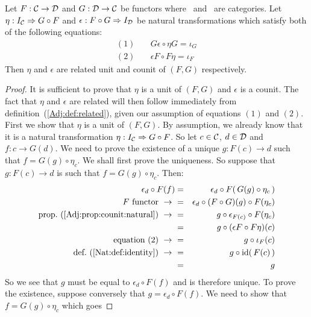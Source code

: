\begin{prop}\label{Adj:prop:related:just:natural}
    Let $F:\mbox{$\cal C$}\to\mbox{$\cal D$}$ and $G:\mbox{$\cal D$}\to\mbox{$\cal C$}$ be functors where \Cat\ and \Dat\ 
    are categories. Let $\eta:I_{\cal C}\Rightarrow G\circ F$ and 
    $\epsilon:F\circ G\Rightarrow I_{\cal D}$ be natural transformations
    which satisfy both of the following equations:
        \begin{eqnarray*}
            (1)&\ &G\epsilon\circ\eta G=\iota_{G}\\
            (2)&\ &\epsilon F \circ F\eta=\iota_{F}
        \end{eqnarray*}
    Then $\eta$ and $\epsilon$ are related unit and counit of $(F,G)$ respectively.
\end{prop}
\begin{proof}
    It is sufficient to prove that $\eta$ is a unit of $(F,G)$ and $\epsilon$ 
    is a counit. The fact that $\eta$ and $\epsilon$ are related will then 
    follow immediately from  definition~(\ref{Adj:def:related}), given our
    assumption of equations $(1)$ and $(2)$. First we show that $\eta$ is
    a unit of $(F,G)$. By assumption, we already know that it is a natural
    transformation $\eta:I_{\cal C}\Rightarrow G\circ F$. So let $c\in\mbox{$\cal C$}$,
    $d\in\mbox{$\cal D$}$ and $f:c\to G(d)$. We need to prove the existence of a unique
    $g:F(c)\to d$ such that $f=G(g)\circ\eta_{c}$. We shall first prove the 
    uniqueness. So suppose that $g:F(c)\to d$ is such that $f=G(g)\circ\eta_{c}$.
    Then:
        \begin{eqnarray*}\epsilon_{d}\circ F(f)
            &=&\epsilon_{d}\circ F(\,G(g)\circ\eta_{c}\,)\\
            \mbox{$F$ functor}\ \to\ 
            &=&\epsilon_{d}\circ (F\circ G)(g)\circ F(\eta_{c})\\
            \mbox{prop.~(\ref{Adj:prop:counit:natural})}\ \to\ 
            &=&g\circ\epsilon_{F(c)}\circ F(\eta_{c})\\
            &=&g\circ (\epsilon F\circ F\eta)(c)\\
            \mbox{equation~$(2)$}\ \to\  
            &=&g\circ\iota_{F}(c)\\
            \mbox{def.~(\ref{Nat:def:identity})}\ \to\ 
            &=&g\circ\id(\,F(c)\,)\\
            &=&g
        \end{eqnarray*}
    So we see that $g$ must be equal to $\epsilon_{d}\circ F(f)$ and is therefore
    unique. To prove the existence, suppose conversely that $g=\epsilon_{d}
    \circ F(f)$. We need to show that $f=G(g)\circ\eta_{c}$ which goes

\end{proof}
